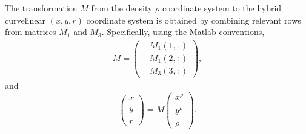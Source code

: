 \documentclass[12pt]{report}
\begin{document}
The transformation $M$ from the density $\rho$ coordinate system to the
hybrid curvelinear $(x,y,r)$ coordinate system is obtained by
combining relevant rows from matrices $M_1$ and $M_3$. Specifically,
using the Matlab conventions,
\begin{align}
  \label{eq:34}
  M = \left(
    \begin{aligned}
     &M_1(1,:)\\
     &M_1(2,:)\\
     &M_3(3,:)
    \end{aligned}\right),
\end{align}
and
\begin{equation}
\label{eq:35}
  \left(\begin{matrix} x\\ \\ y\\ \\ r\end{matrix}\right) =
  M\left(\begin{matrix}x^\rho \\
      \\ y^\rho \\ \\ \rho\end{matrix}\right).
\end{equation}
\end{document}
